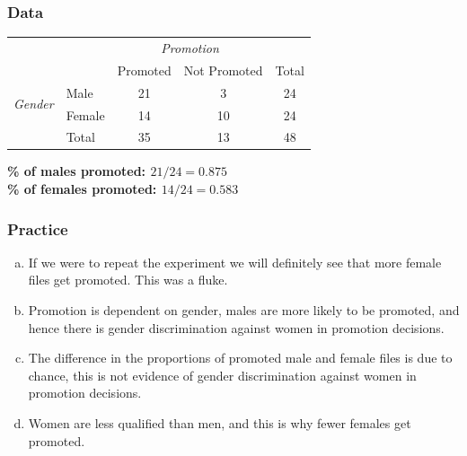 \begin{frame}
\frametitle{Data}


\begin{center}
\begin{tabular}{ll  cc c} 
  		&				& \multicolumn{2}{c}{\textit{Promotion}} \\
\cline{3-4}
							&			& Promoted	& Not Promoted 	& Total	\\
\cline{2-5}
\multirow{2}{*}{\textit{Gender	}}	&Male 		& 21	 	& 3		& 24 	\\
							&Female		& 14	 	& 10 	 	& 24 \\
\cline{2-5}
							&Total		& 35		& 13		& 48 \\
\end{tabular}
\end{center}

\pause

\textbf{\% of males promoted: $21 / 24 = 0.875$} \\
\textbf{\% of females promoted: $14 / 24 = 0.583$}

\end{frame}


\begin{frame}
\frametitle{Practice}


\begin{enumerate}[(a)]

\item If we were to repeat the experiment we will definitely see that more female files get promoted. This was a fluke.

\item Promotion is dependent on gender, males are more likely to be promoted, and hence there is gender discrimination against women in promotion decisions. 

\item The difference in the proportions of promoted male and female files is due to chance, this is not evidence of gender discrimination against women in promotion decisions. 

\item Women are less qualified than men, and this is why fewer females get promoted.

\end{enumerate}

\end{frame}

